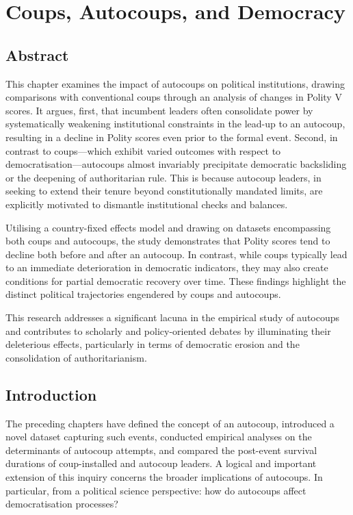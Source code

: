 \documentclass[
  12pt,
]{report}
\begin{document}
\chapter{Coups, Autocoups, and
Democracy}\label{coups-autocoups-and-democracy}

\section*{Abstract}\label{abstract-4}

This chapter examines the impact of autocoups on political institutions,
drawing comparisons with conventional coups through an analysis of
changes in Polity V scores. It argues, first, that incumbent leaders
often consolidate power by systematically weakening institutional
constraints in the lead-up to an autocoup, resulting in a decline in
Polity scores even prior to the formal event. Second, in contrast to
coups---which exhibit varied outcomes with respect to
democratisation---autocoups almost invariably precipitate democratic
backsliding or the deepening of authoritarian rule. This is because
autocoup leaders, in seeking to extend their tenure beyond
constitutionally mandated limits, are explicitly motivated to dismantle
institutional checks and balances.

Utilising a country-fixed effects model and drawing on datasets
encompassing both coups and autocoups, the study demonstrates that
Polity scores tend to decline both before and after an autocoup. In
contrast, while coups typically lead to an immediate deterioration in
democratic indicators, they may also create conditions for partial
democratic recovery over time. These findings highlight the distinct
political trajectories engendered by coups and autocoups.

This research addresses a significant lacuna in the empirical study of
autocoups and contributes to scholarly and policy-oriented debates by
illuminating their deleterious effects, particularly in terms of
democratic erosion and the consolidation of authoritarianism.

\newpage

\section{Introduction}\label{introduction-4}

The preceding chapters have defined the concept of an autocoup,
introduced a novel dataset capturing such events, conducted empirical
analyses on the determinants of autocoup attempts, and compared the
post-event survival durations of coup-installed and autocoup leaders. A
logical and important extension of this inquiry concerns the broader
implications of autocoups. In particular, from a political science
perspective: how do autocoups affect democratisation processes?
\end{document}

